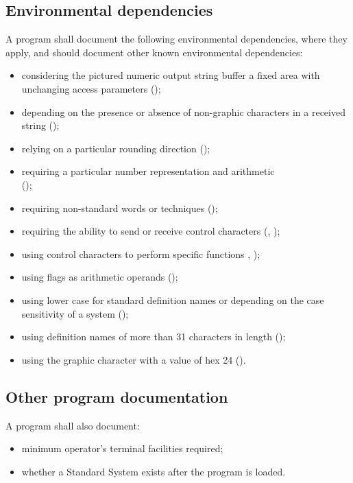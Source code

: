 \subsection{Environmental dependencies} %
\label{doc:env}

A program shall document the following environmental dependencies,
where they apply, and should document other known environmental
dependencies:

\begin{itemize}
\item considering the pictured numeric output string buffer a fixed
	area with unchanging access parameters
	();
%
\item depending on the presence or absence of non-graphic characters
	in a received string ();
%
\item relying on a particular rounding direction
	();
%
\item requiring a particular number representation and arithmetic \\
	();
%
\item requiring non-standard words or techniques
	();
%
\item requiring the ability to send or receive control characters
	(,
	);
%
\item using control characters to perform specific functions
	, );
%
\item using flags as arithmetic operands
	();
%
\item using lower case for standard definition names or depending
	on the case sensitivity of a system
	();
%
\item using definition names of more than 31 characters in length
	();
%
\item using the graphic character with a value of hex 24
	().
\end{itemize}


\subsection{Other program documentation} %

A program shall also document:

\begin{itemize}
\item minimum operator's terminal facilities required;
%
\item whether a Standard System exists after the program is loaded.
\end{itemize}
